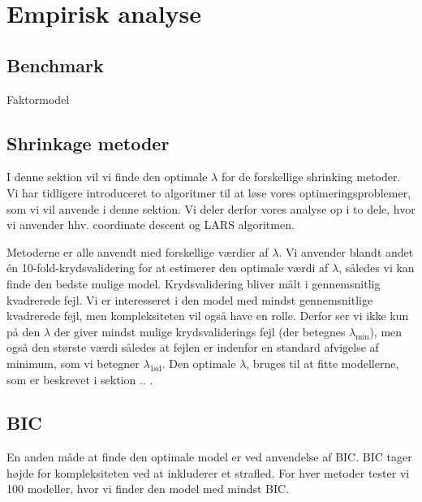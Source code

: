\chapter{Empirisk analyse}
 


\section{Benchmark}
Faktormodel


\section{Shrinkage metoder}
I denne sektion vil vi finde den optimale $\lambda$ for de forskellige shrinking metoder. 
Vi har tidligere introduceret to algoritmer til at løse vores optimeringsproblemer, som vi vil anvende i denne sektion.
Vi deler derfor vores analyse op i to dele, hvor vi anvender hhv. coordinate descent og LARS algoritmen.

Metoderne er alle anvendt med forskellige værdier af $\lambda$. 
Vi anvender blandt andet én 10-fold-krydsvalidering for at estimerer den optimale værdi af $\lambda$, således vi kan finde den bedste mulige model. 
Krydsvalidering bliver målt i gennemsnitlig kvadrerede fejl. 
Vi er interesseret i den model med mindst gennemsnitlige kvadrerede fejl, men kompleksiteten vil også have en rolle.
Derfor ser vi ikke kun på den $\lambda$ der giver mindst mulige krydsvaliderings fejl (der betegnes $\lambda_{\min}$), men også den største værdi således at fejlen er indenfor en standard afvigelse af minimum, som vi betegner $\lambda_{\text{1sd}}$.  
Den optimale $\lambda$, bruges til at fitte modellerne, som er beskrevet i sektion .. .  





\section{BIC}
En anden måde at finde den optimale model er ved anvendelse af BIC. 
BIC tager højde for kompleksiteten ved at inkluderer et strafled.
For hver metoder tester vi 100 modeller, hvor vi finder den model med mindst BIC. 

